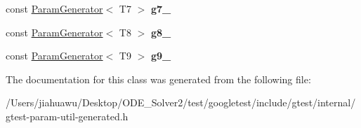 \begin{DoxyCompactItemize}
const \mbox{\hyperlink{classtesting_1_1internal_1_1_param_generator}{Param\+Generator}}$<$ T7 $>$ {\bfseries g7\+\_\+}
\item 
\mbox{\label{classtesting_1_1internal_1_1_cartesian_product_generator9_aaf57427b6fe72dc8d49d85d315baf414}} 
const \mbox{\hyperlink{classtesting_1_1internal_1_1_param_generator}{Param\+Generator}}$<$ T8 $>$ {\bfseries g8\+\_\+}
\item 
\mbox{\label{classtesting_1_1internal_1_1_cartesian_product_generator9_a6d4e5519d1051143b283a2ddbd0d58ec}} 
const \mbox{\hyperlink{classtesting_1_1internal_1_1_param_generator}{Param\+Generator}}$<$ T9 $>$ {\bfseries g9\+\_\+}
\end{DoxyCompactItemize}


The documentation for this class was generated from the following file\+:\begin{DoxyCompactItemize}
\item 
/\+Users/jiahuawu/\+Desktop/\+O\+D\+E\+\_\+\+Solver2/test/googletest/include/gtest/internal/gtest-\/param-\/util-\/generated.\+h\end{DoxyCompactItemize}
